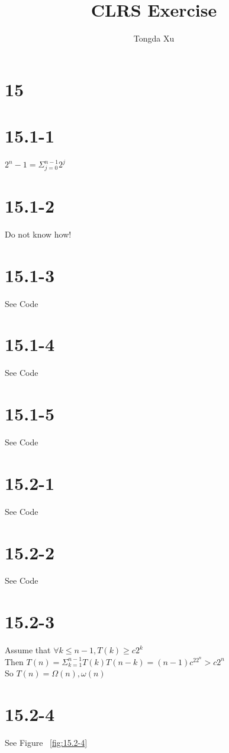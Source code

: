 \documentclass[]{article}
\title{CLRS Exercise}
\author{Tongda Xu}
\begin{document}
\maketitle


\section{15}

\section{15.1-1}
$2^n -1 = \Sigma_{j = 0}^{n-1} 2^j $
\section{15.1-2}
Do not know how!

\section{15.1-3}
See Code

\section{15.1-4}
See Code

\section{15.1-5}
See Code

\section{15.2-1}
See Code

\section{15.2-2}
See Code

\section{15.2-3}

Assume that $\forall k \le n-1, T(k) \ge c2^k$\\
Then $T(n) = \Sigma_{k = 1}^{n-1} T(k)T(n-k) = (n-1)c^22^n > c2^n$\\
So $T(n) = \Omega (n), \omega(n)$

\section{15.2-4}
See Figure ~\ref{fig:15.2-4}
\end{document}
